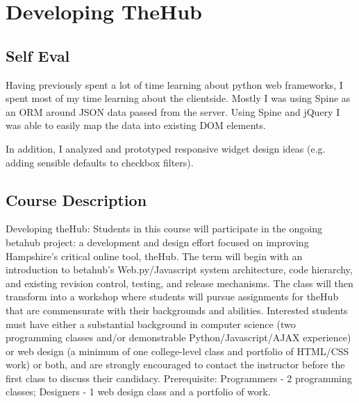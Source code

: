 \section{Developing TheHub}

\begin{meta}
\end{meta}


\subsection*{Self Eval}
Having previously spent a lot of time learning about python web
frameworks, I spent most of my time learning about the clientside.
Mostly I was using Spine as an ORM around JSON data passed from the
server. Using Spine and jQuery I was able to easily map the data into
existing DOM elements.

In addition, I analyzed and prototyped responsive widget design ideas
(e.g. adding sensible defaults to checkbox filters).


\subsection*{Course Description}
Developing theHub: Students in this course will participate in the
ongoing betahub project: a development and design effort focused on
improving Hampshire's critical online tool, theHub. The term will begin
with an introduction to betahub's Web.py/Javascript system architecture,
code hierarchy, and existing revision control, testing, and release
mechanisms. The class will then transform into a workshop where students
will pursue assignments for theHub that are commensurate with their
backgrounds and abilities. Interested students must have either a
substantial background in computer science (two programming classes
and/or demonstrable Python/Javascript/AJAX experience) or web design (a
minimum of one college-level class and portfolio of HTML/CSS work) or
both, and are strongly encouraged to contact the instructor before the
first class to discuss their candidacy. Prerequisite: Programmers - 2
programming classes; Designers - 1 web design class and a portfolio of
work.
